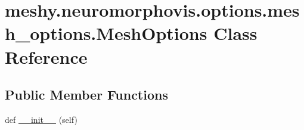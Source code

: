 \hypertarget{classmeshy_1_1neuromorphovis_1_1options_1_1mesh__options_1_1MeshOptions}{}\section{meshy.\+neuromorphovis.\+options.\+mesh\+\_\+options.\+Mesh\+Options Class Reference}
\label{classmeshy_1_1neuromorphovis_1_1options_1_1mesh__options_1_1MeshOptions}


 


\subsection*{Public Member Functions}
\begin{DoxyCompactItemize}
\item 
def \hyperlink{classmeshy_1_1neuromorphovis_1_1options_1_1mesh__options_1_1MeshOptions_a826550c5aa91c880d72c5cef1f8cb2cf}{\+\_\+\+\_\+init\+\_\+\+\_\+} (self)
\end{DoxyCompactItemize}

